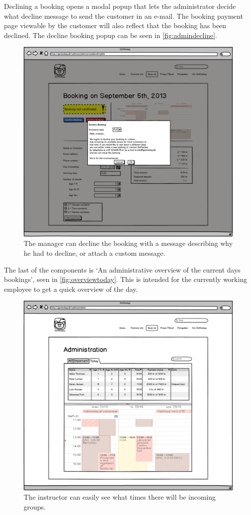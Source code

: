 Declining a booking opens a modal popup that lets the administrator decide what
decline message to send the customer in an e-mail. The booking payment page
viewable by the customer will also reflect that the booking has been declined.
The decline booking popup can be seen in \autoref{fig:admindecline}.

\begin{figure}[htbp]
    \centering
        \includegraphics[width=.6\textwidth]{figures/mockup/admin_booking_decline.png}
	    \caption{The manager can decline the booking with a message describing why he had to decline, or attach a custom message.}
        \label{fig:admindecline}
\end{figure}

\FloatBarrier
\newpage

The last of the components is `An administrative overview of the current days
bookings', seen in \autoref{fig:overviewtoday}. This is intended for the
currently working employee to get a quick overview of the day. 

\begin{figure}[htbp]
    \centering
        \includegraphics[width=.6\textwidth]{figures/mockup/overview_today.png}
	    \caption{The instructor can easily see what times there will be incoming groups.}
        \label{fig:overviewtoday}
\end{figure}

